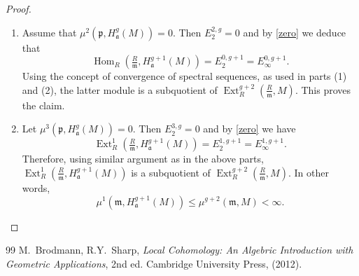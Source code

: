 \documentclass[10pt,a4paper]{amsart}
\def\Ext{\operatorname{Ext}}
\def\Hom{\operatorname{Hom}}
\newcommand{\fa}{\mathfrak{a}}
\newcommand{\m}{\mathfrak{m}}
\newcommand{\p}{\mathfrak{p}}
\begin{document}
\begin{proof}
\begin{enumerate}
 \item Assume that $\mu^2(\p, H^g_{\fa}(M))= 0$. Then $E_2^{2, g}= 0$ and by \ref{zero} we deduce that 
 \[\Hom_{R }(\tfrac{R}{\m}, H^{g+ 1}_{\fa}(M))= E_2^{0, g+ 1}= E_{\infty}^{0, g+ 1}.\]
 Using the concept of convergence of spectral sequences, as used in parts (1) and (2),  the latter module is a subquotient of $\Ext^{g+ 2}_{R}(\tfrac{R}{\m}, M)$. This proves the claim.
 \item Let $\mu^3(\p, H^g_{\fa}(M))= 0$. Then $E_2^{3, g}= 0$ and by \ref{zero} we have 
 \[\Ext^1_{R }(\tfrac{R}{\m}, H^{g+ 1}_{\fa}(M))= E_2^{1, g+ 1}= E_{\infty}^{1, g+ 1}.\] 
 Therefore, using similar argument as in the above parts,  $\Ext^1_{R }(\tfrac{R}{\m}, H^{g+ 1}_{\fa}(M))$ is a subquotient of $\Ext^{g+ 2}_{R}(\tfrac{R}{\m}, M)$. In other words, $$\mu^1(\m, H^{g+ 1}_{\fa}(M)) \leq \mu^{g+ 2}(\m, M)< \infty.$$
 \end{enumerate}
\end{proof}

\begin{thebibliography}{99}
 M.\ Brodmann, R.Y.\ Sharp, {\em Local Cohomology: An Algebric Introduction with Geometric Applications}, 2nd ed. Cambridge University Press, (2012).
\end{thebibliography}
\end{document}
